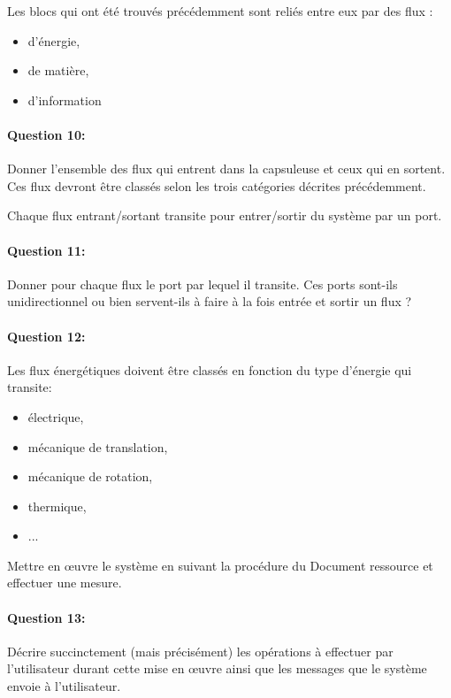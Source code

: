 
Les blocs qui ont été trouvés précédemment sont reliés entre eux par des flux :
\begin{itemize}
 \item d'énergie,
 \item de matière,
 \item d'information
\end{itemize}

\paragraph{Question 10:} Donner l'ensemble des flux qui entrent dans la capsuleuse et ceux qui en sortent. Ces flux devront être classés selon les trois catégories décrites précédemment.

Chaque flux entrant/sortant transite pour entrer/sortir du système par un port.

\paragraph{Question 11:} Donner pour chaque flux le port par lequel il transite. Ces ports sont-ils unidirectionnel ou bien servent-ils à faire à la fois entrée et sortir un flux ?

\paragraph{Question 12:} Les flux énergétiques doivent être classés en fonction du type d'énergie qui transite:
\begin{itemize}
 \item électrique,
 \item mécanique de translation,
 \item mécanique de rotation,
 \item thermique,
 \item ...
\end{itemize}


Mettre en \oe uvre le système en suivant la procédure du Document ressource et effectuer une mesure.

\paragraph{Question 13:} Décrire succinctement (mais précisément) les opérations à effectuer par l'utilisateur durant cette mise en \oe uvre ainsi que les messages que le système envoie à l'utilisateur.


